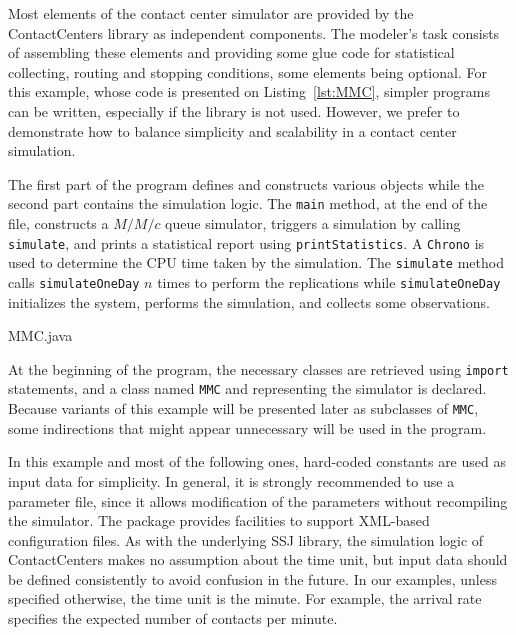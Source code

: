 Most elements of the contact center simulator are
provided by the ContactCenters library as independent components.
The modeler's task consists of assembling these elements and
providing some glue code for statistical collecting, routing and stopping
conditions, some elements being optional.
For this example, whose code is presented on Listing~\ref{lst:MMC},
simpler programs can be written, especially
if the library is not used.  However,
we prefer to demonstrate how to balance simplicity and scalability in
a contact center simulation.

The first part of the program defines and constructs various objects
while the second part contains the simulation logic. The \texttt{main}
method, at the end of the file, constructs a $M/M/c$ queue simulator,
triggers a
simulation by calling \texttt{simulate}, and prints a statistical
report using \texttt{print\-Statistics}.  A \texttt{Chrono} is used to
determine the CPU time taken by the simulation.
The \texttt{simulate} method calls
\texttt{simulate\-One\-Day} $n$ times to perform the
replications while \texttt{simulate\-One\-Day} initializes the system,
performs the simulation, and collects some observations.


{MMC.java}

At the beginning of the program, the necessary classes are retrieved
using \texttt{import} statements, and
a class named \texttt{MMC} and representing the simulator is declared.
Because variants of this example will be presented later as subclasses of
\texttt{MMC}, some indirections that might appear
unnecessary will be used in the program.

In this example and most of the following ones, hard-coded constants are
used as
input data for simplicity.  In general, it is strongly
recommended to use a parameter file, since it allows modification of
the parameters without recompiling the simulator.  The package
 provides facilities to support
XML-based configuration files.  As with the underlying SSJ library,
the simulation
logic of ContactCenters makes no assumption about the time unit, but
input data should be defined consistently to avoid confusion in the
future.  In our examples, unless specified otherwise, the time
unit is the minute.  For example, the arrival rate specifies the
expected number of contacts per minute.

